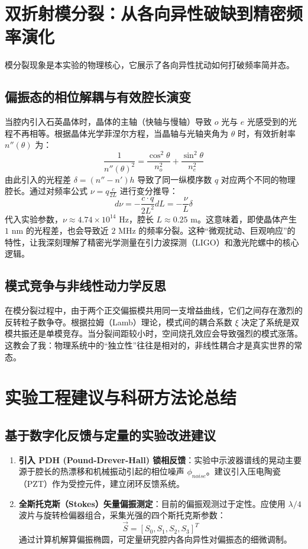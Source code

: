 \documentclass[12pt,a4paper]{article}
\begin{document}
\section{双折射模分裂：从各向异性破缺到精密频率演化}

模分裂现象是本实验的物理核心，它展示了各向异性扰动如何打破频率简并态。

\subsection{偏振态的相位解耦与有效腔长演变}
当腔内引入石英晶体时，晶体的主轴（快轴与慢轴）导致 $o$ 光与 $e$ 光感受到的光程不再相等。根据晶体光学菲涅尔方程，当晶轴与光轴夹角为 $\theta$ 时，有效折射率 $n''(\theta)$ 为：
\begin{equation}
    \frac{1}{n''(\theta)^2} = \frac{\cos^2 \theta}{n_o^2} + \frac{\sin^2 \theta}{n_e^2}
\end{equation}
由此引入的光程差 $\delta = (n'' - n')h$ 导致了同一纵模序数 $q$ 对应两个不同的物理腔长。通过对频率公式 $\nu = q \frac{c}{2L}$ 进行变分推导：
\begin{equation}
    d\nu = -\frac{c \cdot q}{2L^2} dL = -\frac{\nu}{L} \delta
\end{equation}
代入实验参数，$\nu \approx 4.74 \times 10^{14}$ Hz，腔长 $L \approx 0.25$ m。这意味着，即使晶体产生 $1$ nm 的光程差，也会导致近 $2$ MHz 的频率分裂。这种“微观扰动、巨观响应”的特性，让我深刻理解了精密光学测量在引力波探测（LIGO）和激光陀螺中的核心逻辑。

\subsection{模式竞争与非线性动力学反思}
在模分裂过程中，由于两个正交偏振模共用同一支增益曲线，它们之间存在激烈的反转粒子数争夺。根据拉姆（Lamb）理论，模式间的耦合系数 $\xi$ 决定了系统是双模共振还是单模竞存。当分裂间距较小时，空间烧孔效应会导致强烈的模式涨落。这教会了我：物理系统中的“独立性”往往是相对的，非线性耦合才是真实世界的常态。

\section{实验工程建议与科研方法论总结}

\subsection{基于数字化反馈与定量的实验改进建议}
\begin{enumerate}
    \item \textbf{引入 PDH (Pound-Drever-Hall) 锁相反馈}：实验中示波器谱线的晃动主要源于腔长的热漂移和机械振动引起的相位噪声 $\phi_{noise}$。建议引入压电陶瓷（PZT）作为受控元件，建立闭环反馈系统。
    \item \textbf{全斯托克斯（Stokes）矢量偏振测定}：目前的偏振观测过于定性。应使用 $\lambda/4$ 波片与旋转检偏器组合，采集光强的四个斯托克斯参数：
    \begin{equation}
        \vec{S} = [S_0, S_1, S_2, S_3]^T
    \end{equation}
    通过计算机解算偏振椭圆，可定量研究腔内各向异性对偏振态的细微调制。
\end{enumerate}
\end{document}

